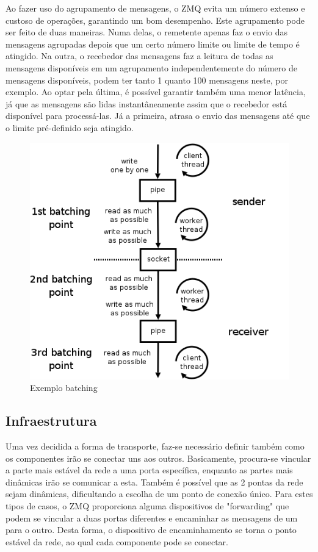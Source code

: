 \documentclass[12pt]{article}
\begin{document}
	Ao fazer uso do agrupamento de mensagens, o ZMQ evita um número extenso e custoso de operações, garantindo um bom desempenho. Este agrupamento pode ser feito de duas maneiras. Numa delas, o remetente apenas faz o envio das mensagens agrupadas depois que um certo número limite ou limite de tempo é atingido. Na outra, o recebedor das mensagens faz a leitura de todas as mensagens disponíveis em um agrupamento independentemente do número de mensagens disponíveis, podem ter tanto 1 quanto 100 mensagens neste, por exemplo. Ao optar pela última, é possível garantir também uma menor latência, já que as mensagens são lidas instantâneamente assim que o recebedor está disponível para processá-las. Já a primeira, atrasa o envio das mensagens até que o limite pré-definido seja atingido.
    
\begin{figure}[ht]
\centering
\includegraphics[width=.5\textwidth]{batching.png}
\caption{Exemplo batching}
\label{fig:exampleFig4}
\end{figure}


\subsection{Infraestrutura}

	Uma vez decidida a forma de transporte, faz-se necessário definir também como os componentes irão se conectar uns aos outros. Basicamente, procura-se vincular a parte mais estável da rede a uma porta específica, enquanto as partes mais dinâmicas irão se comunicar a esta. Também é possível que as 2 pontas da rede sejam dinâmicas, dificultando a escolha de um ponto de conexão único. Para estes tipos de casos, o ZMQ proporciona alguma dispositivos de "forwarding" que podem se vincular a duas portas diferentes e encaminhar as mensagens de um para o outro. Desta forma, o dispositivo de encaminhamento se torna o ponto estável da rede, ao qual cada componente pode se conectar.
\end{document}
